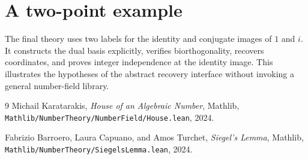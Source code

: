 \documentclass[11pt,a4paper]{article}
\begin{document}
\section{A two-point example}
The final theory uses two labels for the identity and conjugate images
of $1$ and $i$. It constructs the dual basis explicitly, verifies
biorthogonality, recovers coordinates, and proves integer independence
at the identity image. This illustrates the hypotheses of the abstract
recovery interface without invoking a general number-field library.



\begin{thebibliography}{9}
Michail Karatarakis, \emph{House of an Algebraic Number},
Mathlib, \texttt{Mathlib/NumberTheory/NumberField/House.lean}, 2024.

Fabrizio Barroero, Laura Capuano, and Amos Turchet,
\emph{Siegel's Lemma}, Mathlib,
\texttt{Mathlib/NumberTheory/SiegelsLemma.lean}, 2024.
\end{thebibliography}
\end{document}
